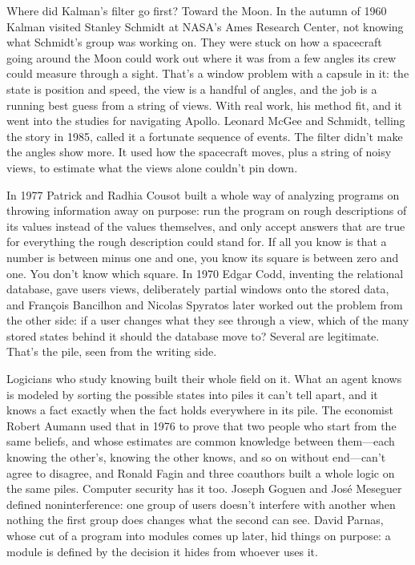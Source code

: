 \documentclass[11pt,twoside]{article}
\theoremstyle{thielethm}
\theoremstyle{thieledef}
\theoremstyle{thieledef}
\theoremstyle{thieledef}
\theoremstyle{thielethm}
\theoremstyle{thieleobs}
\theoremstyle{thielethm}
\begin{document}
Where did Kalman's filter go first? Toward the Moon. In the autumn of 1960 Kalman visited Stanley Schmidt at NASA's Ames Research Center, not knowing what Schmidt's group was working on. They were stuck on how a spacecraft going around the Moon could work out where it was from a few angles its crew could measure through a sight. That's a window problem with a capsule in it: the state is position and speed, the view is a handful of angles, and the job is a running best guess from a string of views. With real work, his method fit, and it went into the studies for navigating Apollo. Leonard McGee and Schmidt, telling the story in 1985, called it a fortunate sequence of events. The filter didn't make the angles show more. It used how the spacecraft moves, plus a string of noisy views, to estimate what the views alone couldn't pin down.

In 1977 Patrick and Radhia Cousot built a whole way of analyzing programs on throwing information away on purpose: run the program on rough descriptions of its values instead of the values themselves, and only accept answers that are true for everything the rough description could stand for. If all you know is that a number is between minus one and one, you know its square is between zero and one. You don't know which square. In 1970 Edgar Codd, inventing the relational database, gave users views, deliberately partial windows onto the stored data, and François Bancilhon and Nicolas Spyratos later worked out the problem from the other side: if a user changes what they see through a view, which of the many stored states behind it should the database move to? Several are legitimate. That's the pile, seen from the writing side.

Logicians who study knowing built their whole field on it. What an agent knows is modeled by sorting the possible states into piles it can't tell apart, and it knows a fact exactly when the fact holds everywhere in its pile. The economist Robert Aumann used that in 1976 to prove that two people who start from the same beliefs, and whose estimates are common knowledge between them---each knowing the other's, knowing the other knows, and so on without end---can't agree to disagree, and Ronald Fagin and three coauthors built a whole logic on the same piles. Computer security has it too. Joseph Goguen and José Meseguer defined noninterference: one group of users doesn't interfere with another when nothing the first group does changes what the second can see. David Parnas, whose cut of a program into modules comes up later, hid things on purpose: a module is defined by the decision it hides from whoever uses it.
\end{document}
